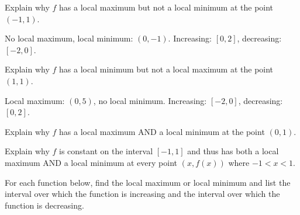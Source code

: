 \documentclass{ximera}
\begin{document}
\begin{question}
Explain why $f$ has a local maximum but not a local minimum at the point $(-1, 1)$.
\begin{solution}
No local maximum,  local minimum: $(0,-1)$.  Increasing: $[0,2]$, decreasing: $[-2,0]$.
\end{solution}

\end{question}

\begin{question}
Explain why  $f$ has a local minimum but not a local maximum at the point $(1, 1)$.
\begin{solution}
Local maximum: $(0,5)$, no local minimum.  Increasing: $[-2,0]$, decreasing: $[0,2]$.
\end{solution}

\end{question}

\begin{question}
Explain why $f$ has a local maximum AND a local minimum at the point $(0, 1)$.
\end{question}

\begin{question}
Explain why $f$ is constant on the interval $[-1, 1]$ and thus has both a local maximum AND a local minimum at every point $(x, f(x))$ where $-1 < x < 1$.
\end{question}

\begin{question}
For each function below, find the local maximum or local minimum and list the interval over which the function is increasing and the interval over which the function is decreasing. 


\end{question}

\begin{question}
% 
\end{question}

\begin{question}
% 


\end{question}
\end{document}
